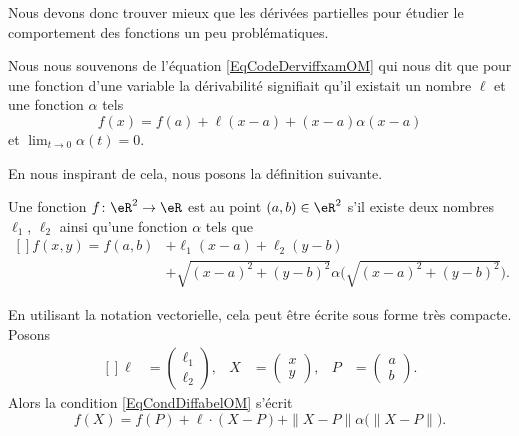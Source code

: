 Nous devons donc trouver mieux que les dérivées partielles pour étudier le comportement des fonctions un peu problématiques.

Nous nous souvenons de l'équation \eqref{EqCodeDerviffxamOM} qui nous dit que pour une fonction d'une variable la dérivabilité signifiait qu'il existait un nombre $\ell$ et une fonction $\alpha$ tels
\begin{equation}
    f(x)=f(a)+\ell(x-a)+(x-a)\alpha(x-a)
\end{equation}
et $\lim_{t\to 0} \alpha(t)=0$. 

En nous inspirant de cela, nous posons la définition suivante.
\begin{definition}      \label{DefDiffabelOM}
    Une fonction $f\colon \eR^2\to \eR$ est  au point $(a,b)\in\eR^2$ s'il existe deux nombres $\ell_1$, $\ell_2$ ainsi qu'une fonction $\alpha$ tels que
    \begin{equation}\label{EqCondDiffabelOM}
        \begin{aligned}[]
            f(x,y)=f(a,b)&+\ell_1(x-a)+\ell_2(y-b)\\
                    &+\sqrt{(x-a)^2+(y-b)^2}\alpha\big( \sqrt{(x-a)^2+(y-b)^2} \big).
        \end{aligned}
    \end{equation}
\end{definition}

En utilisant la notation vectorielle, cela peut être écrite sous forme très compacte. Posons
\begin{equation}
    \begin{aligned}[]
        \ell&=\begin{pmatrix}
            \ell_1    \\ 
            \ell_2    
        \end{pmatrix},&
        X&=\begin{pmatrix}
            x    \\ 
            y    
        \end{pmatrix},&
        P&=\begin{pmatrix}
            a    \\ 
            b    
        \end{pmatrix}.
    \end{aligned}
\end{equation}
Alors la condition \eqref{EqCondDiffabelOM} s'écrit
\begin{equation}
    f(X)=f(P)+\ell\cdot(X-P)+\| X-P \|\alpha\big( \| X-P \| \big).
\end{equation}

